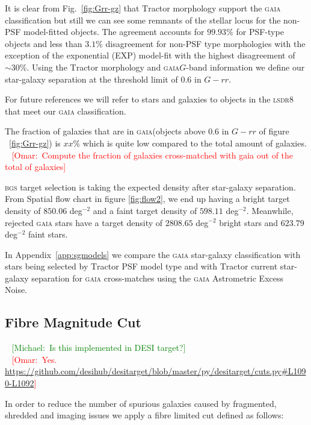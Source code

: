 \documentclass[fleqn,usenatbib]{mnras}
\newcommand{\mike}[1]{~\newline\noindent \textcolor{Green}{{ [Michael:~{#1}]\\}}}
\newcommand{\omar}[1]{~\newline\noindent \textcolor{red}{{ [Omar:~{#1}]\\}}}
\newcommand{\BGS}{\textsc{bgs}\xspace}
\newcommand{\DReight}{\textsc{dr8}\xspace}
\newcommand{\GAIA}{\textsc{gaia}\xspace}
\newcommand{\LS}{\textsc{ls}\xspace}
\newcommand{\TRACTOR}{\textsc{T}ractor\xspace}
\begin{document}
It is clear from Fig.~\ref{fig:Grr-gz} that \TRACTOR morphology support the \GAIA classification but still we can see some remnants of the stellar locus for the non-PSF model-fitted objects. The agreement accounts for $99.93 \%$ for PSF-type objects and less than $3.1 \%$ disagreement for non-PSF type morphologies with the exception of the exponential (EXP) model-fit with the highest disagreement of $\sim 30 \%$. Using the \TRACTOR morphology and \GAIA $G$-band information we define our star-galaxy separation at the threshold limit of $0.6$ in $G-rr$. 

For future references we will refer to stars and galaxies to objects in the \LS \DReight that meet our \GAIA classification. 

The fraction of galaxies that are in \GAIA (objects above $0.6$ in $G-rr$ of figure ~\ref{fig:Grr-gz}) is $xx \%$ which is quite low compared to the total amount of galaxies.
\omar{Compute the fraction of galaxies cross-matched with gaia out of the total of galaxies}

\BGS target selection is taking the expected density after star-galaxy separation. From Spatial flow chart in figure \ref{fig:flow2}, we end up having a bright target density of $850.06$ deg$^{-2}$ and a faint target density of $598.11$ deg$^{-2}$. Meanwhile, rejected \GAIA stars have a target density of $2808.65$ deg$^{-2}$ bright stars and $623.79$ deg$^{-2}$ faint stars.

In Appendix~\ref{app:sgmodels} we compare the \GAIA star-galaxy classification with stars being selected by \TRACTOR PSF model type and with \TRACTOR current star-galaxy separation for \GAIA cross-matches using the \GAIA Astrometric Excess Noise.

\subsection{Fibre Magnitude Cut}
\mike{Is this implemented in DESI target?}
\omar{Yes. \url{https://github.com/desihub/desitarget/blob/master/py/desitarget/cuts.py\#L1090-L1092}}

In order to reduce the number of spurious galaxies caused by fragmented, shredded and imaging issues we apply a fibre limited cut defined as follows:

\end{document}
